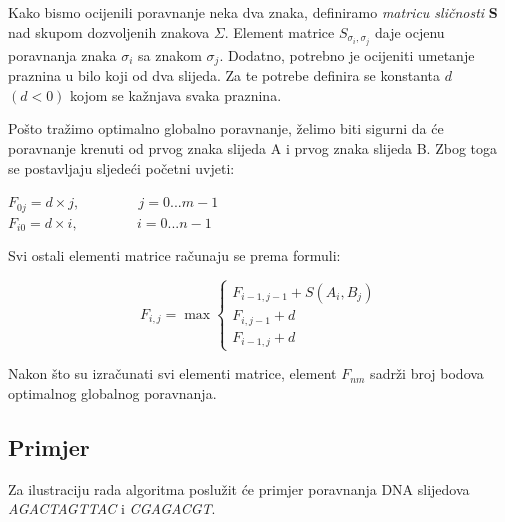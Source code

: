 \documentclass[times, utf8, zavrsni, numeric]{fer}
\begin{document}
Kako bismo ocijenili poravnanje neka dva znaka, definiramo \textit{matricu sličnosti} \textbf{S} nad skupom dozvoljenih znakova $\Sigma$. Element matrice $S_{\sigma_{i}, \sigma_{j}}$ daje ocjenu poravnanja znaka $\sigma_{i}$ sa znakom $\sigma_{j}$. Dodatno, potrebno je ocijeniti umetanje praznina u bilo koji od dva slijeda. Za te potrebe definira se konstanta $d$ $(d < 0)$ kojom se kažnjava svaka praznina.

Pošto tražimo optimalno globalno poravnanje, želimo biti sigurni da će poravnanje krenuti od prvog znaka slijeda A i prvog znaka slijeda B. Zbog toga se postavljaju sljedeći početni uvjeti:
\begin{center}
$F_{0j} = d \times j,\hspace{50pt} j = 0...m - 1$\\
$F_{i0} = d \times i,\hspace{50pt} i = 0...n - 1$
\end{center}
Svi ostali elementi matrice računaju se prema formuli:
\begin{center}
\begin{equation}
F_{i, j} = \max \left\{
	\begin{array}{lr}
		F_{i-1,j-1} + S(A_{i}, B_{j}) \\
		F_{i, j-1} + d \\
		F_{i-1, j} + d
	\end{array}
\right.
\end{equation}
\end{center}

Nakon što su izračunati svi elementi matrice, element $F_{nm}$ sadrži broj bodova optimalnog globalnog poravnanja.

\subsection{Primjer}
\indent

Za ilustraciju rada algoritma poslužit će primjer poravnanja DNA slijedova \emph{AGACTAGTTAC} i \emph{CGAGACGT}.
\end{document}
